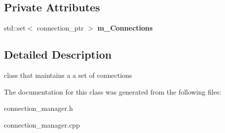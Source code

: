 \subsection*{Private Attributes}
\begin{DoxyCompactItemize}
\item 
\hypertarget{classhttp__server_1_1cConnectionManager_a6bc3632311d979511b8393d611b88752}{std\-::set$<$ connection\-\_\-ptr $>$ {\bfseries m\-\_\-\-Connections}}\label{classhttp__server_1_1cConnectionManager_a6bc3632311d979511b8393d611b88752}

\end{DoxyCompactItemize}


\subsection{Detailed Description}
class that maintains a a set of connections 

The documentation for this class was generated from the following files\-:\begin{DoxyCompactItemize}
\item 
connection\-\_\-manager.\-h\item 
connection\-\_\-manager.\-cpp\end{DoxyCompactItemize}
